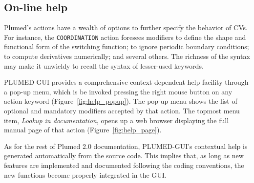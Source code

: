 \documentclass[preprint,12pt]{elsarticle}
\begin{document}
\subsection{On-line help}

Plumed's actions have a wealth of options to further specify the
behavior of CVs. For instance, the \texttt{COORDINATION} action
foresees modifiers to define the shape and functional form of the
switching function; to ignore periodic boundary conditions; to compute
derivatives numerically; and several others. The richness of the
syntax may make it unwieldy to recall the syntax of lesser-used
keywords.


PLUMED-GUI provides a comprehensive context-dependent help facility
through a pop-up menu, which is be invoked pressing the right mouse
button on any action keyword (Figure~\ref{fig:help_popup}). The pop-up
menu shows the list of optional and mandatory modifiers accepted by
that action.  The topmost menu item, \emph{Lookup in documentation},
opens up a web browser  displaying the full manual page of that action
(Figure~\ref{fig:help_page}).

As for the rest of Plumed 2.0 documentation, PLUMED-GUI's contextual
help is generated automatically from the source code.  This implies
that, as long as new features are implemented and documented following
the coding conventions, the new functions become properly integrated
in the GUI.


\end{document}
